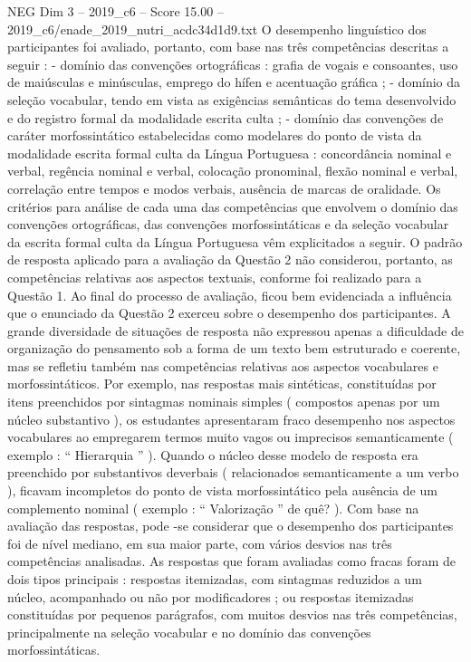 \begin{textsample}{NEG Dim 3 – 2019\_c6 – Score 15.00 – 2019\_c6/enade\_2019\_nutri\_acdc34d1d9.txt}
O desempenho linguístico dos participantes foi avaliado, portanto, com base nas três competências descritas a seguir : - domínio das convenções ortográficas : grafia de vogais e consoantes, uso de maiúsculas e minúsculas, emprego do hífen e acentuação gráfica ; - domínio da seleção vocabular, tendo em vista as exigências semânticas do tema desenvolvido e do registro formal da modalidade escrita culta ; - domínio das convenções de caráter morfossintático estabelecidas como modelares do ponto de vista da modalidade escrita formal culta da Língua Portuguesa : concordância nominal e verbal, regência nominal e verbal, colocação pronominal, flexão nominal e verbal, correlação entre tempos e modos verbais, ausência de marcas de oralidade.
Os critérios para análise de cada uma das competências que envolvem o domínio das convenções ortográficas, das convenções morfossintáticas e da seleção vocabular da escrita formal culta da Língua Portuguesa vêm explicitados a seguir.
O padrão de resposta aplicado para a avaliação da Questão 2 não considerou, portanto, as competências relativas aos aspectos textuais, conforme foi realizado para a Questão 1.
Ao final do processo de avaliação, ficou bem evidenciada a influência que o enunciado da Questão 2 exerceu sobre o desempenho dos participantes.
A grande diversidade de situações de resposta não expressou apenas a dificuldade de organização do pensamento sob a forma de um texto bem estruturado e coerente, mas se refletiu também nas competências relativas aos aspectos vocabulares e morfossintáticos.
Por exemplo, nas respostas mais sintéticas, constituídas por itens preenchidos por sintagmas nominais simples ( compostos apenas por um núcleo substantivo ), os estudantes apresentaram fraco desempenho nos aspectos vocabulares ao empregarem termos muito vagos ou imprecisos semanticamente ( exemplo : “ Hierarquia ” ).
Quando o núcleo desse modelo de resposta era preenchido por substantivos deverbais ( relacionados semanticamente a um verbo ), ficavam incompletos do ponto de vista morfossintático pela ausência de um complemento nominal ( exemplo : “ Valorização ” de quê? ).
Com base na avaliação das respostas, pode -se considerar que o desempenho dos participantes foi de nível mediano, em sua maior parte, com vários desvios nas três competências analisadas.
As respostas que foram avaliadas como fracas foram de dois tipos principais : respostas itemizadas, com sintagmas reduzidos a um núcleo, acompanhado ou não por modificadores ; ou respostas itemizadas constituídas por pequenos parágrafos, com muitos desvios nas três competências, principalmente na seleção vocabular e no domínio das convenções morfossintáticas.

\end{textsample}

